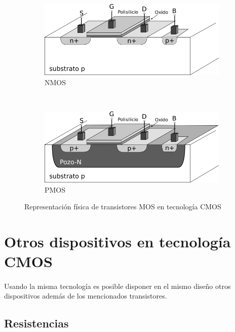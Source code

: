 \begin{figure}
	\centering
	\begin{subfigure}[b]{0.45\textwidth}
		\includegraphics[width=\textwidth]{img/nmos.png}
		\caption{NMOS}
		\label{fig:nmos}
	\end{subfigure}
	~ %
	\begin{subfigure}[b]{0.45\textwidth}
		\includegraphics[width=\textwidth]{img/pmos.png}
		\caption{PMOS}
		\label{fig:pmos}
	\end{subfigure}
	\caption{Representación física de transistores MOS en tecnología CMOS}
	\label{fig:cmos_transistors}
\end{figure}

\section{Otros dispositivos en tecnología CMOS}\label{cap:otros_dispositivos}

\paragraph{}
Usando la misma tecnología es posible disponer en el mismo diseño otros dispositivos
además de los mencionados transistores.

\subsection{Resistencias}
